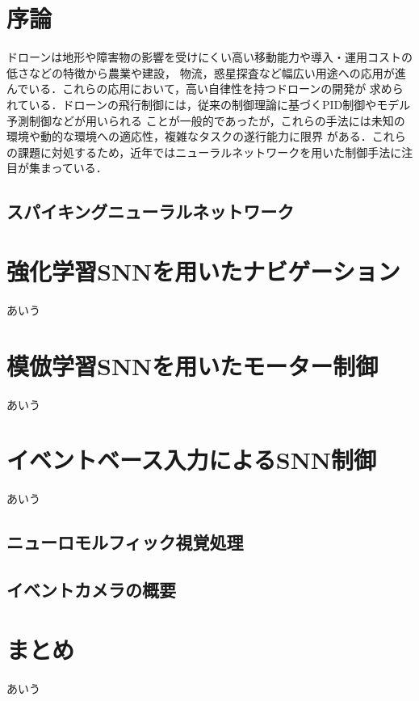 \documentclass[a4paper,10.5pt,dvipdfmx]{bxjsarticle}
\begin{document}
\begin{multicols}{2}

\section{序論}
ドローンは地形や障害物の影響を受けにくい高い移動能力や導入・運用コストの低さなどの特徴から農業や建設，
物流，惑星探査など幅広い用途への応用が進んでいる．これらの応用において，高い自律性を持つドローンの開発が
求められている．ドローンの飛行制御には，従来の制御理論に基づくPID制御やモデル予測制御などが用いられる
ことが一般的であったが，これらの手法には未知の環境や動的な環境への適応性，複雑なタスクの遂行能力に限界
がある．これらの課題に対処するため，近年ではニューラルネットワークを用いた制御手法に注目が集まっている．

\subsection{スパイキングニューラルネットワーク}

\section{強化学習SNNを用いたナビゲーション}
あいう\cite{lee2025bio}

\section{模倣学習SNNを用いたモーター制御}
あいう\cite{stroobants2025neuromorphic}

\section{イベントベース入力によるSNN制御}
あいう\cite{paredes2024fully}
\subsection{ニューロモルフィック視覚処理}
\subsection{イベントカメラの概要}

\subsection{}
\section{まとめ}
あいう




\end{multicols}
\end{document}
